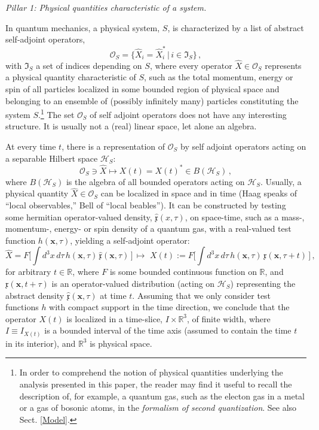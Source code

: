 \documentclass[12pt]{article}
\begin{document}
\textit{{Pillar 1}: Physical quantities characteristic of a system.}

In quantum mechanics, a physical system, $S$, is characterized by a list of abstract self-adjoint operators,
\begin{equation}\label{phys quantities}
\mathcal{O}_{S}= \big\{\hat{X}_i = \hat{X}^{*}_i\,\vert\, i \in \mathfrak{I}_S\big\}\,,
\end{equation}
with $\mathfrak{I}_S$ a set of indices depending on $S$, where every operator $\hat{X} \in \mathcal{O}_S$ represents a
physical quantity characteristic of $S$, such as the total momentum, energy or spin of all particles localized in some bounded
region of physical space and belonging to an ensemble of (possibly infinitely many) particles constituting the system $S$.\footnote{In order to comprehend the notion of physical quantities underlying the analysis presented in this paper, the reader
may find it useful to recall the description of, for example, a quantum gas, such as the electon gas in a metal or a gas of
bosonic atoms, in the \textit{formalism of second quantization}. See also Sect. \ref{Model}.} The set $\mathcal{O}_S$ of self adjoint operators does not have any interesting structure. It is usually not a (real) linear space, let alone an algebra.

At every time $t$, there is a representation of
$\mathcal{O}_S$ by self adjoint operators acting on a separable Hilbert space $\mathcal{H}_S$:
\begin{equation}\label{Rep}
\mathcal{O}_S \ni \hat{X} \mapsto X(t)= X(t)^{*} \in B(\mathcal{H}_S)\,,
\end{equation}
where $B(\mathcal{H}_S)$ is the algebra of all bounded operators
acting on $\mathcal{H}_S$. Usually, a physical quantity $\hat{X}\in
\mathcal{O}_S$ can be localized in space and in time ({Haag}
\cite{Haag} speaks of ``local observables,'' {Bell} \cite{Bell}
of ``local beables''). It can be constructed by testing some hermitian
operator-valued density, $\hat{\mathfrak{x}}(x,\tau)$, on space-time,
such as a mass-, momentum-, energy- or spin density of a quantum gas,
with a real-valued test function $h(\mathbf{x},\tau)$, yielding a
self-adjoint operator:
\begin{equation}\label{phys quantity}
\hat{X}=F\Big[\int d^{3}x\, d\tau\, h(\mathbf{x},\tau)\, \hat{\mathfrak{x}}(\mathbf{x},\tau)\,\Big]\, \mapsto \,\,
X(t) := F\Big[ \int d^{3}x \, d\tau \,h(\mathbf{x},\tau)\, \mathfrak{x}(\mathbf{x}, \tau+ t)\,\Big]\,,
\end{equation}
for arbitrary $t\in \mathbb{R}$, where $F$ is some bounded continuous function on $\mathbb{R}$, and $\mathfrak{x}(\mathbf{x},t+\tau)$
is an operator-valued distribution (acting on $\mathcal{H}_S$)
representing the abstract density $\hat{\mathfrak{x}}(\mathbf{x}, \tau)$ at time $t$.
Assuming that we only consider test functions $h$ with compact support in the time direction, we conclude that the operator
$X(t)$ is localized in a time-slice, $I\times \mathbb{R}^{3}$, of finite width, where $I\equiv I_{X(t)}$ is a bounded interval of the
time axis (assumed to contain the time $t$ in its interior), and $\mathbb{R}^{3}$ is physical space.\\
\end{document}
